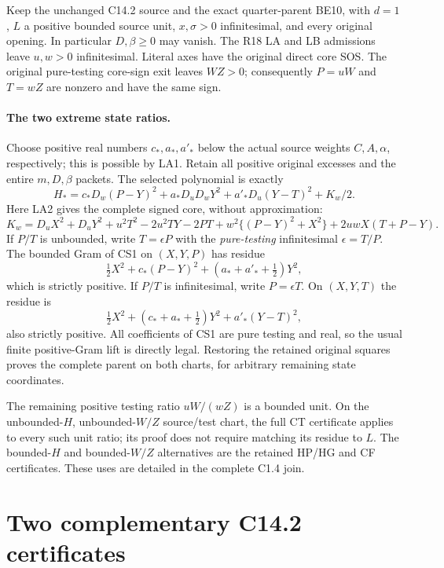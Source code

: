 Keep the unchanged C14.2 source and the exact quarter-parent BE10,
with $d=1$, $L$ a positive bounded source unit, $x,\sigma>0$
infinitesimal, and every original opening.  In particular $D,\beta\ge0$
may vanish.  The R18 LA and LB admissions leave $u,w>0$
infinitesimal.  Literal axes have the original direct core SOS.
The original pure-testing core-sign exit leaves $WZ>0$; consequently
$P=uW$ and $T=wZ$ are nonzero and have the same sign.

\paragraph{The two extreme state ratios.}
Choose positive real numbers $c_*,a_*,a'_* $ below the actual
source weights $C,A,\alpha$, respectively; this is possible by LA1.
Retain all positive original excesses and the entire $m,D,\beta$
packets.  The selected polynomial is exactly
\[
 H_*=c_*D_w(P-Y)^2+a_*D_uD_wY^2
       +a'_*D_u(Y-T)^2+K_w/2.                     \tag{CS1}
\]
Here LA2 gives the complete signed core, without approximation:
\[
 K_w=D_uX^2+D_uY^2+u^2T^2-2u^2TY-2PT
       +w^2\{(P-Y)^2+X^2\}+2uwX(T+P-Y).          \tag{CS2}
\]
If $P/T$ is unbounded, write $T=\epsilon P$ with the
\emph{pure-testing} infinitesimal $\epsilon=T/P$.  The bounded
Gram of CS1 on $(X,Y,P)$ has residue
\[
 \tfrac12X^2+c_*(P-Y)^2+(a_*+a'_*+\tfrac12)Y^2,
                                                               \tag{CS3}
\]
which is strictly positive.  If $P/T$ is infinitesimal, write
$P=\epsilon T$.  On $(X,Y,T)$ the residue is
\[
 \tfrac12X^2+(c_*+a_*+\tfrac12)Y^2+a'_*(Y-T)^2,  \tag{CS4}
\]
also strictly positive.  All coefficients of CS1 are pure testing
and real, so the usual finite positive-Gram lift is directly legal.
Restoring the retained original squares proves the complete parent
on both charts, for arbitrary remaining state coordinates.


The remaining positive testing ratio $uW/(wZ)$ is a bounded
unit.  On the unbounded-$H$, unbounded-$W/Z$ source/test chart,
the full CT certificate applies to every such unit ratio; its proof
does not require matching its residue to $L$.  The bounded-$H$
and bounded-$W/Z$ alternatives are the retained HP/HG and CF
certificates.  These uses are detailed in the complete C1.4 join.


\section{\texorpdfstring{Two complementary C14.2 certificates}{Two complementary C14.2 certificates}}
\label{component:p98e371f5b846}

